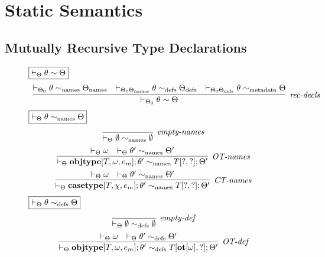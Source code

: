\section{Static Semantics}
\subsection{Mutually Recursive Type Declarations}
\newpage
\begin{figure}[h]
$\fbox{$\vdash_\Theta \theta \sim \Theta$}$
\[
\begin{array}{c}
\infer[\textit{rec-decls}]
  {\vdash_{\Theta_0} \theta \sim \Theta}
  { \vdash_{\Theta_0} \theta \sim_{\text{names}} \Theta_{\text{names}}
  & \vdash_{\Theta_0 \Theta_{\text{names}}} \theta \sim_{\text{defs}} \Theta_{\text{defs}}
  & \vdash_{\Theta_0 \Theta_{\text{defs}}} \theta \sim_{\text{metadata}} \Theta
  } 
\end{array}
\]
$\fbox{$\vdash_\Theta \theta \sim_{\text{names}} \Theta$}$
\[
\begin{array}{c}
\infer[\textit{empty-names}]
  {\vdash_{\Theta} \emptyset \sim_{\text{names}} \emptyset}
  { }\\[1ex] 
  
\infer[\textit{OT-names}]
  {\vdash_{\Theta} \keyw{objtype}[T,\omega,e_m];\theta' \sim_{\text{names}} T[?,?];\Theta'}
  { \vdash_{\Theta} \omega
  & \vdash_{\Theta} \theta' \sim_{\text{names}} \Theta'}\\[1ex]

\infer[\textit{CT-names}]
  {\vdash_{\Theta} \keyw{casetype}[T,\chi,e_m];\theta' \sim_{\text{names}} T[?,?];\Theta'}
  { \vdash_{\Theta} \omega
  & \vdash_{\Theta} \theta' \sim_{\text{names}} \Theta'}
\end{array}
\]
$\fbox{$\vdash_\Theta \theta \sim_{\text{defs}} \Theta$}$
\[
\begin{array}{c}
\infer[\textit{empty-def}]
  {\vdash_{\Theta} \emptyset \sim_{\text{defs}} \emptyset}
  { }\\[1ex] 
  
\infer[\textit{OT-def}]
  {\vdash_{\Theta} \keyw{objtype}[T,\omega,e_m];\theta' \sim_{\text{defs}} T[\keyw{ot}[\omega], ?]; \Theta'}
  { \vdash_\Theta \omega
  & \vdash _\Theta \theta' \sim_{\text{defs}} \Theta'}\\[1ex]


\end{array}\]
\end{figure}
